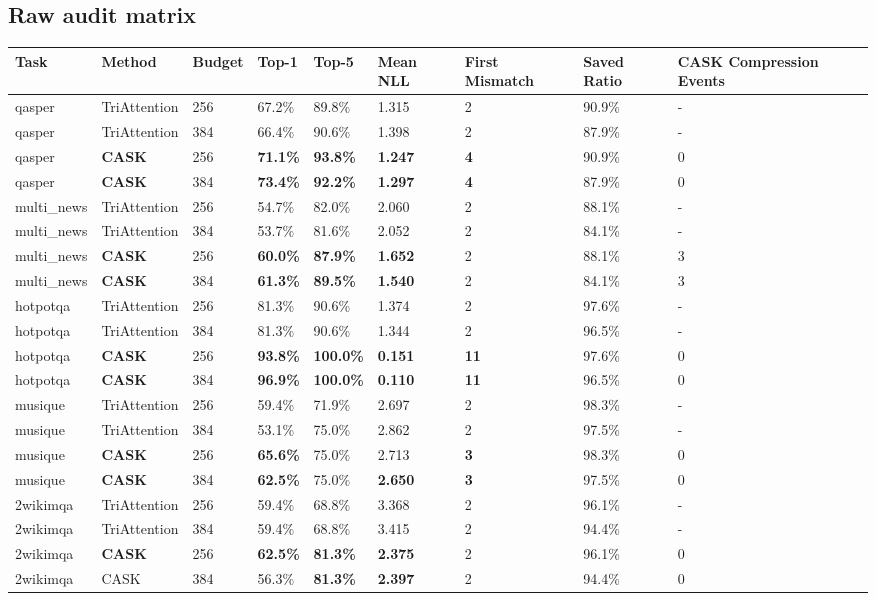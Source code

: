 \subsection{Raw audit matrix}


\begin{table}[H]
\centering
\small
\begin{tabularx}{\textwidth}{YYYYYYYYY}
\toprule
Task & Method & Budget & Top-1 & Top-5 & Mean NLL & First Mismatch & Saved Ratio & CASK Compression Events \\
\midrule
qasper & TriAttention & 256 & 67.2\% & 89.8\% & 1.315 & 2 & 90.9\% & - \\
qasper & TriAttention & 384 & 66.4\% & 90.6\% & 1.398 & 2 & 87.9\% & - \\
qasper & \textbf{CASK} & 256 & \textbf{71.1\%} & \textbf{93.8\%} & \textbf{1.247} & \textbf{4} & 90.9\% & 0 \\
qasper & \textbf{CASK} & 384 & \textbf{73.4\%} & \textbf{92.2\%} & \textbf{1.297} & \textbf{4} & 87.9\% & 0 \\
multi\_news & TriAttention & 256 & 54.7\% & 82.0\% & 2.060 & 2 & 88.1\% & - \\
multi\_news & TriAttention & 384 & 53.7\% & 81.6\% & 2.052 & 2 & 84.1\% & - \\
multi\_news & \textbf{CASK} & 256 & \textbf{60.0\%} & \textbf{87.9\%} & \textbf{1.652} & 2 & 88.1\% & 3 \\
multi\_news & \textbf{CASK} & 384 & \textbf{61.3\%} & \textbf{89.5\%} & \textbf{1.540} & 2 & 84.1\% & 3 \\
hotpotqa & TriAttention & 256 & 81.3\% & 90.6\% & 1.374 & 2 & 97.6\% & - \\
hotpotqa & TriAttention & 384 & 81.3\% & 90.6\% & 1.344 & 2 & 96.5\% & - \\
hotpotqa & \textbf{CASK} & 256 & \textbf{93.8\%} & \textbf{100.0\%} & \textbf{0.151} & \textbf{11} & 97.6\% & 0 \\
hotpotqa & \textbf{CASK} & 384 & \textbf{96.9\%} & \textbf{100.0\%} & \textbf{0.110} & \textbf{11} & 96.5\% & 0 \\
musique & TriAttention & 256 & 59.4\% & 71.9\% & 2.697 & 2 & 98.3\% & - \\
musique & TriAttention & 384 & 53.1\% & 75.0\% & 2.862 & 2 & 97.5\% & - \\
musique & \textbf{CASK} & 256 & \textbf{65.6\%} & 75.0\% & 2.713 & \textbf{3} & 98.3\% & 0 \\
musique & \textbf{CASK} & 384 & \textbf{62.5\%} & 75.0\% & \textbf{2.650} & \textbf{3} & 97.5\% & 0 \\
2wikimqa & TriAttention & 256 & 59.4\% & 68.8\% & 3.368 & 2 & 96.1\% & - \\
2wikimqa & TriAttention & 384 & 59.4\% & 68.8\% & 3.415 & 2 & 94.4\% & - \\
2wikimqa & \textbf{CASK} & 256 & \textbf{62.5\%} & \textbf{81.3\%} & \textbf{2.375} & 2 & 96.1\% & 0 \\
2wikimqa & CASK & 384 & 56.3\% & \textbf{81.3\%} & \textbf{2.397} & 2 & 94.4\% & 0 \\
\bottomrule
\end{tabularx}
\end{table}


